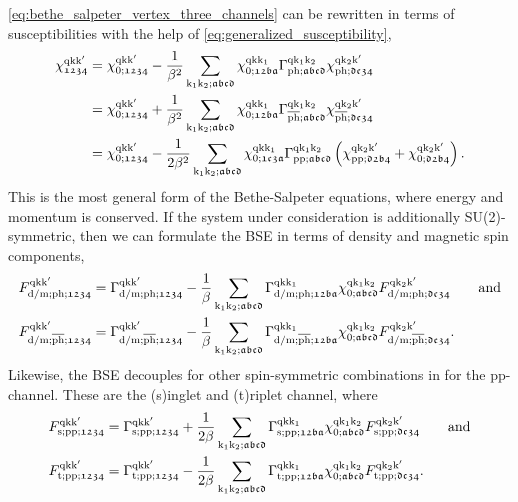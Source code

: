 \documentclass[../../main.tex]{subfiles}
\begin{document}
\eqref{eq:bethe_salpeter_vertex_three_channels} can be rewritten in terms of susceptibilities with the help of \eqref{eq:generalized_susceptibility},
\begin{subequations}\label{eq:bethe_salpeter_susc}
\begin{align}
	\chi^{\text{q}\text{k}\text{k}'}_{\mathfrak{1234}}&=\chi^{\text{q}\text{k}\text{k}'}_{0;\mathfrak{1234}}-\frac{1}{\beta^2}\sum_{\text{k}_1\text{k}_2;\mathfrak{abcd}}\chi^{\text{q}\text{k}\text{k}_1}_{0;\mathfrak{12ba}} \Gamma^{\text{q}\text{k}_1\text{k}_2}_{\text{ph};\mathfrak{abcd}} \chi^{\text{q}\text{k}_2\text{k}'}_{\text{ph};\mathfrak{dc34}}\\
	&=\chi^{\text{q}\text{k}\text{k}'}_{0;\mathfrak{1234}}+\frac{1}{\beta^2}\sum_{\text{k}_1\text{k}_2;\mathfrak{abcd}}\chi^{\text{q}\text{k}\text{k}_1}_{0;\mathfrak{12ba}} \Gamma^{\text{q}\text{k}_1\text{k}_2}_{\overline{\text{ph}};\mathfrak{abcd}} \chi^{\text{q}\text{k}_2\text{k}'}_{\overline{\text{ph}};\mathfrak{dc34}}\\
	&=\chi^{\text{q}\text{k}\text{k}'}_{0;\mathfrak{1234}}-\frac{1}{2\beta^2}\sum_{\text{k}_1\text{k}_2;\mathfrak{abcd}}\chi^{\text{q}\text{k}\text{k}_1}_{0;\mathfrak{1c3a}}\Gamma^{\text{q}\text{k}_1\text{k}_2}_{\text{pp};\mathfrak{abcd}}\left (\chi^{\text{q}\text{k}_2\text{k}'}_{\text{pp};\mathfrak{d2b4}}+\chi^{\text{q}\text{k}_2\text{k}'}_{0;\mathfrak{d2b4}}\right )\label{eq:bethe_salpeter_susc_pp}.
\end{align}
\end{subequations}
This is the most general form of the Bethe-Salpeter equations, where energy and momentum is conserved. If the system under consideration is additionally SU(2)-symmetric, then we can formulate the BSE in terms of density and magnetic spin components,
\begin{subequations}
\begin{align}
	F_{\text{d}/\text{m};\text{ph};\mathfrak{1234}}^{\text{q}\text{k}\text{k}'}&=\Gamma_{\text{d}/\text{m};\text{ph};\mathfrak{1234}}^{\text{q}\text{k}\text{k}'}-\frac1\beta\sum_{\text{k}_1\text{k}_2;\mathfrak{abcd}} \Gamma_{\text{d}/\text{m};\text{ph};\mathfrak{12ba}}^{\text{q}\text{k}\text{k}_1} \chi_{0;\mathfrak{abcd}}^{\text{q}\text{k}_1\text{k}_2} F_{\text{d}/\text{m};\text{ph};\mathfrak{dc34}}^{\text{q}\text{k}_2\text{k}'}\qquad\text{and}\\
	F_{\text{d}/\text{m};\overline{\text{ph}};\mathfrak{1234}}^{\text{q}\text{k}\text{k}'}&=\Gamma_{\text{d}/\text{m};\overline{\text{ph}};\mathfrak{1234}}^{\text{q}\text{k}\text{k}'}-\frac1\beta\sum_{\text{k}_1\text{k}_2;\mathfrak{abcd}} \Gamma_{\text{d}/\text{m};\overline{\text{ph}};\mathfrak{12ba}}^{\text{q}\text{k}\text{k}_1} \chi_{0;\mathfrak{abcd}}^{\text{q}\text{k}_1\text{k}_2} F_{\text{d}/\text{m};\overline{\text{ph}};\mathfrak{dc34}}^{\text{q}\text{k}_2\text{k}'}.
\end{align}
\end{subequations}
Likewise, the BSE decouples for other spin-symmetric combinations in for the pp-channel. These are the (s)inglet and (t)riplet channel, where
\begin{align}
	F_{\text{s};\text{pp};\mathfrak{1234}}^{\text{q}\text{k}\text{k}'}&=\Gamma_{\text{s};\text{pp};\mathfrak{1234}}^{\text{q}\text{k}\text{k}'}+\frac{1}{2\beta}\sum_{\text{k}_1\text{k}_2;\mathfrak{abcd}} \Gamma_{\text{s};\text{pp};\mathfrak{12ba}}^{\text{q}\text{k}\text{k}_1} \chi_{0;\mathfrak{abcd}}^{\text{q}\text{k}_1\text{k}_2} F_{\text{s};\text{pp};\mathfrak{dc34}}^{\text{q}\text{k}_2\text{k}'}\qquad\text{and}\\
	F_{\text{t};\text{pp};\mathfrak{1234}}^{\text{q}\text{k}\text{k}'}&=\Gamma_{\text{t};\text{pp};\mathfrak{1234}}^{\text{q}\text{k}\text{k}'}-\frac{1}{2\beta}\sum_{\text{k}_1\text{k}_2;\mathfrak{abcd}} \Gamma_{\text{t};\text{pp};\mathfrak{12ba}}^{\text{q}\text{k}\text{k}_1} \chi_{0;\mathfrak{abcd}}^{\text{q}\text{k}_1\text{k}_2} F_{\text{t};\text{pp};\mathfrak{dc34}}^{\text{q}\text{k}_2\text{k}'}.
\end{align}
\end{document}
